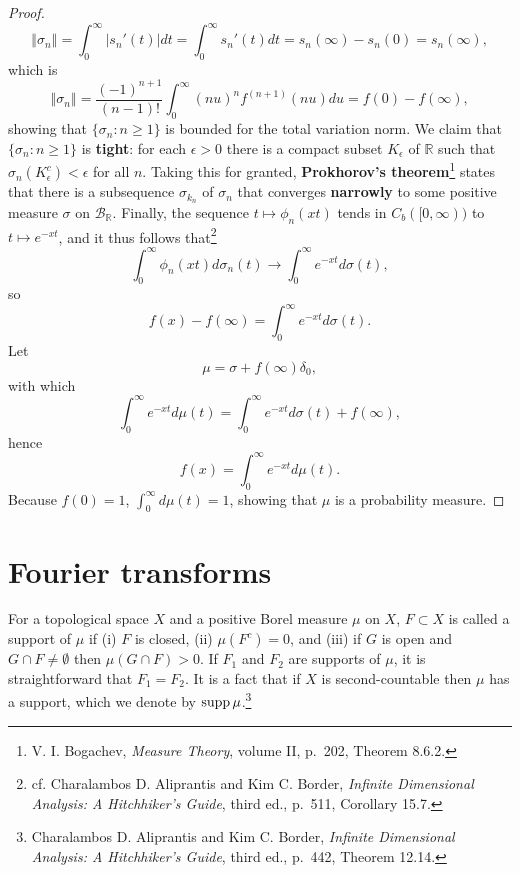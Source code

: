 \documentclass{article}
\newcommand{\supp}{\ensuremath\mathrm{supp}\,}
\newcommand{\norm}[1]{\left\Vert #1 \right\Vert}
\theoremstyle{definition}
\begin{document}
\begin{proof}
\[
\norm{\sigma_n} = \int_0^\infty |s_n'(t)| dt =  \int_0^\infty s_n'(t) dt 
=s_n(\infty) - s_n(0) = s_n(\infty),
\]
which is
\[
\norm{\sigma_n} = \frac{(-1)^{n+1}}{(n-1)!} \int_0^\infty (nu)^n f^{(n+1)}(nu) du
=f(0)-f(\infty),
\]
showing that $\{\sigma_n: n \geq 1\}$ is bounded for the total variation norm. 
We claim that $\{\sigma_n: n \geq 1\}$ is \textbf{tight}: for each $\epsilon>0$ there is a compact subset
$K_\epsilon$ of $\mathbb{R}$ such that $\sigma_n(K_\epsilon^c)<\epsilon$ for all $n$. 
Taking this for granted, \textbf{Prokhorov's theorem}\footnote{V. I. Bogachev, {\em Measure Theory},
volume II, p.~202, Theorem 8.6.2.} states that there is a subsequence
$\sigma_{k_n}$ of $\sigma_n$  that converges \textbf{narrowly} to some positive measure $\sigma$ on
$\mathscr{B}_{\mathbb{R}}$. Finally, the sequence
$t \mapsto \phi_n(xt)$ tends in $C_b([0,\infty))$ to $t \mapsto e^{-xt}$, and it thus follows that\footnote{cf. Charalambos D. Aliprantis
and Kim C. Border, {\em Infinite Dimensional Analysis: A Hitchhiker's Guide}, third ed., p.~511, Corollary 15.7.}
\[
\int_0^\infty \phi_n(xt) d\sigma_n(t) \to \int_0^\infty e^{-xt} d\sigma(t),
\]
so
\[
f(x)-f(\infty) =  \int_0^\infty e^{-xt} d\sigma(t).
\]
Let
\[
\mu=\sigma+f(\infty) \delta_0,
\]
with which
\[
 \int_0^\infty e^{-xt} d\mu(t) =  \int_0^\infty e^{-xt} d\sigma(t) + f(\infty),
\]
hence 
\[
f(x) =  \int_0^\infty e^{-xt} d\mu(t).
\]
Because $f(0)=1$, $\int_0^\infty d\mu(t)=1$, showing that $\mu$ is a probability measure.
\end{proof}


\section{Fourier transforms}
For a topological space $X$ and a positive Borel measure $\mu$ on $X$, 
$F \subset X$ is called a support of $\mu$ if (i) $F$ is closed, 
(ii) $\mu(F^c)=0$, and (iii) if $G$ is open and $G \cap F \neq \emptyset$ then
$\mu(G \cap F)>0$.
 If $F_1$ and $F_2$ are supports of $\mu$, it is straightforward that $F_1=F_2$.
 It is a fact that if $X$ is second-countable then $\mu$ has a support, which we denote by
 $\supp \mu$.\footnote{Charalambos D. Aliprantis
and Kim C. Border, {\em Infinite Dimensional Analysis: A Hitchhiker's Guide}, third ed., p.~442, Theorem 12.14.}
\end{document}
